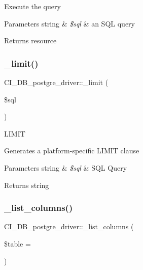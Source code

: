 Execute the query


\begin{DoxyParams}[1]{Parameters}
string & {\em \$sql} & an S\+QL query \\
\hline
\end{DoxyParams}
\begin{DoxyReturn}{Returns}
resource 
\end{DoxyReturn}
\mbox{\label{class_c_i___d_b__postgre__driver_a55c158b72500c2cd4afb2738d3a8de04}} 
\subsubsection{\texorpdfstring{\+\_\+limit()}{\_limit()}}
{\footnotesize\ttfamily C\+I\+\_\+\+D\+B\+\_\+postgre\+\_\+driver\+::\+\_\+limit (\begin{DoxyParamCaption}\item[{}]{\$sql }\end{DoxyParamCaption})\hspace{0.3cm}{\ttfamily [protected]}}

L\+I\+M\+IT

Generates a platform-\/specific L\+I\+M\+IT clause


\begin{DoxyParams}[1]{Parameters}
string & {\em \$sql} & S\+QL Query \\
\hline
\end{DoxyParams}
\begin{DoxyReturn}{Returns}
string 
\end{DoxyReturn}
\mbox{\label{class_c_i___d_b__postgre__driver_a148657a92c450e0f62b47c45b9d82c12}} 
\subsubsection{\texorpdfstring{\+\_\+list\+\_\+columns()}{\_list\_columns()}}
{\footnotesize\ttfamily C\+I\+\_\+\+D\+B\+\_\+postgre\+\_\+driver\+::\+\_\+list\+\_\+columns (\begin{DoxyParamCaption}\item[{}]{\$table = {\ttfamily \textquotesingle{}\textquotesingle{}} }\end{DoxyParamCaption})\hspace{0.3cm}{\ttfamily [protected]}}

